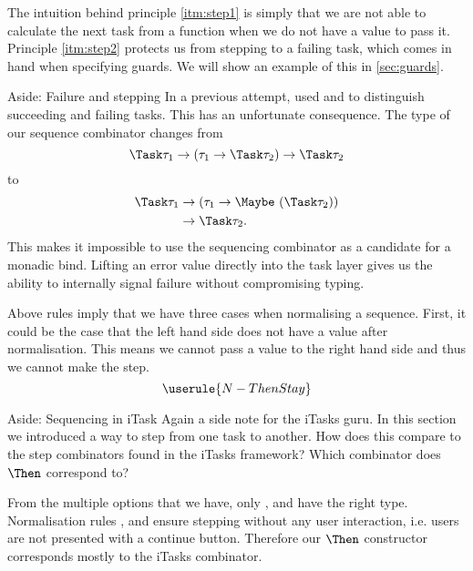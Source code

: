 The intuition behind principle \autoref{itm:step1} is simply that we are not able to calculate the next task from a function
when we do not have a value to pass it.
Principle \autoref{itm:step2} protects us from stepping to a failing task,
which comes in hand when specifying guards.
We will show an example of this in \autoref{sec:guards}.

\begin{margintext}{Aside: Failure and stepping}
  In a previous attempt,
  \textcite{theses/radboud/VinterHviid18} used  and 
  to distinguish succeeding and failing tasks.
  This has an unfortunate consequence.
  The type of our sequence combinator changes from
  \begin{equation*}
    \Task \tau_1 \to (\tau_1 \to \Task \tau_2) \to \Task \tau_2
  \end{equation*}
  to
  \begin{equation*}
    \begin{split}
      \Task \tau_1 &\to (\tau_1 \to \Maybe\ (\Task \tau_2))\\
                   &\to \Task \tau_2.
    \end{split}
  \end{equation*}
  This makes it impossible to use the sequencing combinator as a candidate for a monadic bind.
  Lifting an error value directly into the task layer gives us the ability to internally signal failure
  without compromising typing.
\end{margintext}

Above rules imply that we have three cases when normalising a sequence.
First,
it could be the case that the left hand side does not have a value after normalisation.
This means we cannot pass a value to the right hand side
and thus we cannot make the step.
\begin{equation*}
  \userule{N-ThenStay}
\end{equation*}

\begin{margintext}{Aside: Sequencing in iTask}
  Again a side note for the iTasks guru.
  In this section we introduced a way to step from one task to another.
  How does this compare to the step combinators found in the iTasks framework?
  Which combinator does $\Then$ correspond to?

  From the multiple options that we have,
  only \type{(>>=)}, \type{(>>-)} and \type{(>>\texttilde)} have the right type.
  Normalisation rules ,  and  ensure stepping without any user interaction,
  i.e. users are not presented with a continue button.
  Therefore our $\Then$ constructor corresponds mostly to the iTasks \type{(>>-)} combinator.
\end{margintext}

